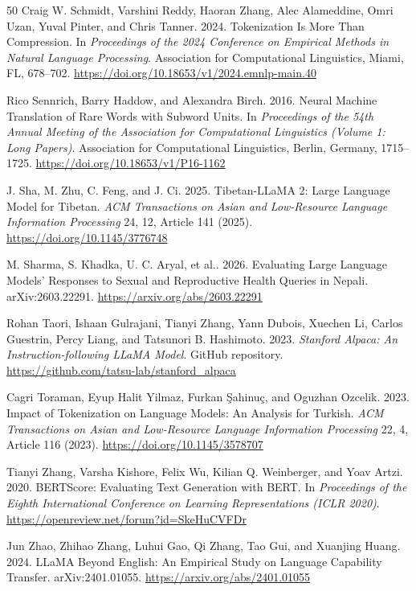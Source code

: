 \documentclass{article}
\begin{document}
\begin{thebibliography}{50}
Craig W. Schmidt, Varshini Reddy, Haoran Zhang, Alec Alameddine, Omri Uzan, Yuval Pinter, and Chris Tanner. 2024. Tokenization Is More Than Compression. In \emph{Proceedings of the 2024 Conference on Empirical Methods in Natural Language Processing}. Association for Computational Linguistics, Miami, FL, 678–702. \url{https://doi.org/10.18653/v1/2024.emnlp-main.40}

Rico Sennrich, Barry Haddow, and Alexandra Birch. 2016. Neural Machine Translation of Rare Words with Subword Units. In \emph{Proceedings of the 54th Annual Meeting of the Association for Computational Linguistics (Volume 1: Long Papers)}. Association for Computational Linguistics, Berlin, Germany, 1715–1725. \url{https://doi.org/10.18653/v1/P16-1162}

J. Sha, M. Zhu, C. Feng, and J. Ci. 2025. Tibetan-LLaMA 2: Large Language Model for Tibetan. \emph{ACM Transactions on Asian and Low-Resource Language Information Processing} 24, 12, Article 141 (2025). \url{https://doi.org/10.1145/3776748}

M. Sharma, S. Khadka, U. C. Aryal, et al.. 2026. Evaluating Large Language Models' Responses to Sexual and Reproductive Health Queries in Nepali. arXiv:2603.22291. \url{https://arxiv.org/abs/2603.22291}

Rohan Taori, Ishaan Gulrajani, Tianyi Zhang, Yann Dubois, Xuechen Li, Carlos Guestrin, Percy Liang, and Tatsunori B. Hashimoto. 2023. \emph{Stanford Alpaca: An Instruction-following LLaMA Model}. GitHub repository. \url{https://github.com/tatsu-lab/stanford_alpaca}

Cagri Toraman, Eyup Halit Yilmaz, Furkan Şahinuç, and Oguzhan Ozcelik. 2023. Impact of Tokenization on Language Models: An Analysis for Turkish. \emph{ACM Transactions on Asian and Low-Resource Language Information Processing} 22, 4, Article 116 (2023). \url{https://doi.org/10.1145/3578707}

Tianyi Zhang, Varsha Kishore, Felix Wu, Kilian Q. Weinberger, and Yoav Artzi. 2020. BERTScore: Evaluating Text Generation with BERT. In \emph{Proceedings of the Eighth International Conference on Learning Representations (ICLR 2020)}. \url{https://openreview.net/forum?id=SkeHuCVFDr}

Jun Zhao, Zhihao Zhang, Luhui Gao, Qi Zhang, Tao Gui, and Xuanjing Huang. 2024. LLaMA Beyond English: An Empirical Study on Language Capability Transfer. arXiv:2401.01055. \url{https://arxiv.org/abs/2401.01055}
\end{thebibliography}
\end{document}
